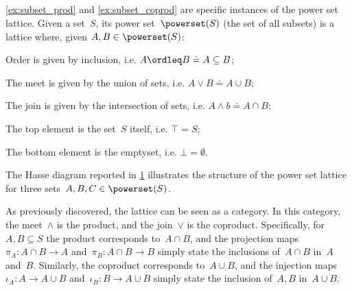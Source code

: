 \subsection{}
\cref{ex:subset_prod} and \cref{ex:subset_coprod} are specific instances of the power set lattice. Given a set~$S$, its power set~$\powerset(S)$ (the set of all subsets) is a lattice where, given $A,B\in \powerset(S)$:
\begin{compactitem}
\item Order is given by inclusion, i.e. $A\ordleq B \doteq A\subseteq B$;
\item The meet is given by the union of sets, i.e. $A\vee B \doteq A\cup B$;
\item The join is given by the intersection of sets, i.e. $A\wedge b \doteq A\cap B$;
\item The top element is the set~$S$ itself, i.e. $\top = S$;
\item The bottom element is the emptyset, i.e. $\bot = \emptyset$.
\end{compactitem}
The Hasse diagram reported in \cref{fig:prod_coprod_power} illustrates the structure of the power set lattice for three sets~$A,B,C\in \powerset(S)$.

\begin{figure}[h]
\begin{center}
\end{center}
\caption{\label{fig:prod_coprod_power}}
\end{figure}
As previously discovered, the lattice can be seen as a category. In this category, the meet~$\wedge$ is the product, and the join~$\vee$ is the coproduct. Specifically, for~$A,B\subseteq S$ the product corresponds to~$A\cap B$, and the projection maps~$\pi_A\colon A\cap B\to A$ and~$\pi_B\colon A\cap B\to B$ simply state the inclusions of~$A\cap B$ in~$A$ and~$B$. Similarly, the coproduct corresponds to~$A\cup B$, and the injection maps~$\iota_A\colon A\to A\cup B$ and~$\iota_B\colon B\to A\cup B$ simply state the inclusion of~$A,B$ in~$A\cup B$.




\subsubsection{}


